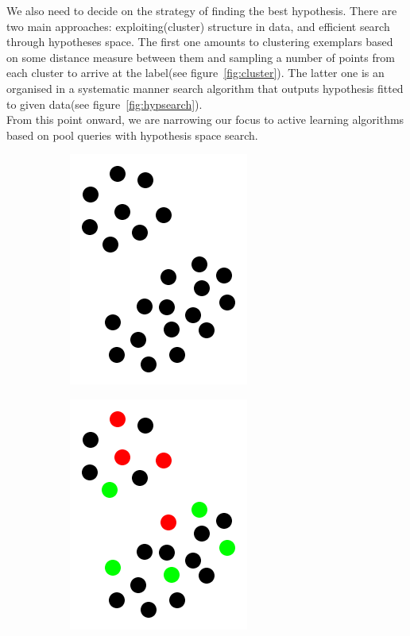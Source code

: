 \documentclass[12pt, a4paper, pdflatex, leqno, twoside]{report}
\begin{document}
We also need to decide on the strategy of finding the best hypothesis. 
There are two main approaches: exploiting(cluster) structure in data, and 
efficient search through hypotheses space. The first one amounts to
clustering exemplars based on some distance measure between them and sampling a 
number of points from each cluster to arrive at the label(see 
figure~\ref{fig:cluster}). The latter one is an organised in a systematic manner 
search algorithm that outputs hypothesis fitted to given data(see 
figure~\ref{fig:hypsearch}).\\

From this point onward, we are narrowing our focus to active learning algorithms based on pool queries with hypothesis space search.\\

\begin{figure}[htbp]
\centering
  \begin{subfigure}[b]{0.3\textwidth}
    \centering
    \includegraphics[width=0.5\linewidth]{graphics/cluster1.png}
    \caption{\label{fig:cluster_a}}
  \end{subfigure}
  \begin{subfigure}[b]{0.3\textwidth}
    \centering
    \includegraphics[width=0.5\linewidth]{graphics/cluster2.png}

\end{subfigure}
\end{figure}
\end{document}
